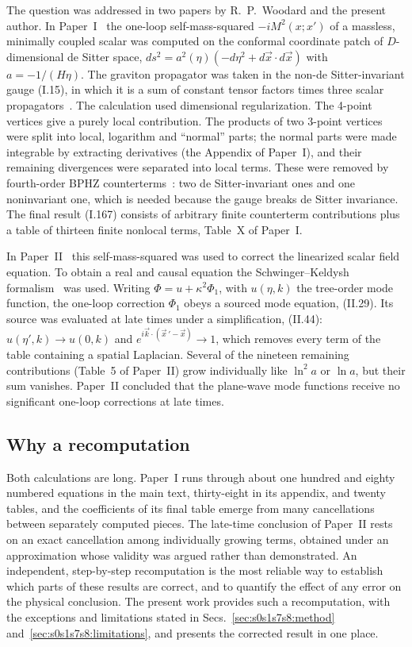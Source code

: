 \documentclass[aps,prd,onecolumn,10pt,nofootinbib,floatfix]{revtex4-2}
\newcommand{\eqI}[1]{(I.#1)}
\newcommand{\eqII}[1]{(II.#1)}
\begin{document}
The question was addressed in two papers by R.~P.~Woodard and the present author. In Paper~I~\cite{KW07} the one-loop
self-mass-squared $-iM^2(x;x')$ of a massless, minimally coupled scalar was computed on the conformal coordinate patch of
$D$-dimensional de Sitter space, $ds^2=a^2(\eta)(-d\eta^2+d\vec x\cdot d\vec x)$ with $a=-1/(H\eta)$. The graviton propagator was
taken in the non-de Sitter-invariant gauge \eqI{15}, in which it is a sum of constant tensor factors times three scalar
propagators~\cite{ref:Tsamis1994,ref:Woodard2006}. The calculation used dimensional regularization. The 4-point vertices give a purely
local contribution. The products of two 3-point vertices were split into local, logarithm and ``normal'' parts; the normal parts
were made integrable by extracting derivatives (the Appendix of Paper~I), and their remaining divergences were separated into local
terms. These were removed by fourth-order BPHZ counterterms~\cite{ref:Bogoliubov1957}: two de Sitter-invariant ones and one
noninvariant one, which is needed because the gauge breaks de Sitter invariance. The final result \eqI{167} consists of arbitrary finite counterterm
contributions plus a table of thirteen finite nonlocal terms, Table~X of Paper~I.

In Paper~II~\cite{KW08} this self-mass-squared was used to correct the linearized scalar field equation. To obtain a real and causal
equation the Schwinger--Keldysh formalism~\cite{ref:Schwinger1961,ref:Keldysh1965,ref:Jordan1986,ref:Calzetta1987} was used. Writing
$\Phi=u+\kappa^2\Phi_1$, with $u(\eta,k)$ the tree-order mode function, the one-loop correction $\Phi_1$ obeys a sourced mode
equation, \eqII{29}. Its source was evaluated at late times under a simplification, \eqII{44}: $u(\eta',k)\to u(0,k)$ and
$e^{i\vec k\cdot(\vec x\,'-\vec x)}\to1$, which removes every term of the table containing a spatial Laplacian. Several of the nineteen
remaining contributions (Table~5 of Paper~II) grow individually like $\ln^2a$ or $\ln a$, but their sum vanishes. Paper~II concluded that the plane-wave
mode functions receive no significant one-loop corrections at late times.

\subsection{Why a recomputation}

Both calculations are long. Paper~I runs through about one hundred and eighty numbered equations in the main text, thirty-eight in its
appendix, and twenty tables, and the coefficients of its final table emerge from many cancellations between separately computed
pieces. The late-time conclusion of Paper~II rests on an exact cancellation among individually growing terms, obtained under an
approximation whose validity was argued rather than demonstrated. An independent, step-by-step recomputation is the most reliable way
to establish which parts of these results are correct, and to quantify the effect of any error on the physical conclusion. The present
work provides such a recomputation, with the exceptions and limitations stated in Secs.~\ref{sec:s0s1s7s8:method}
and~\ref{sec:s0s1s7s8:limitations}, and presents the corrected result in one place.
\end{document}
